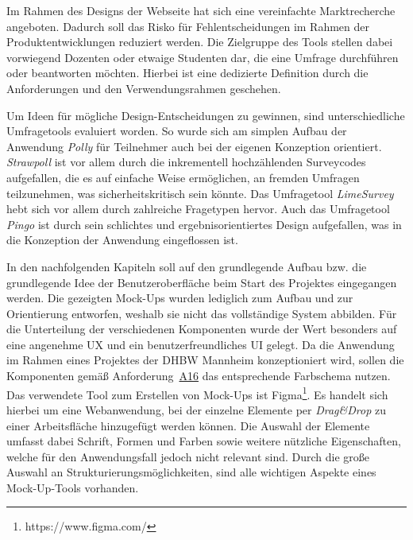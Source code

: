 Im Rahmen des Designs der Webseite hat sich eine vereinfachte Marktrecherche angeboten.
Dadurch soll das Risko für Fehlentscheidungen im Rahmen der Produktentwicklungen reduziert werden.\autocite{Pioch2019}
Die Zielgruppe des Tools stellen dabei vorwiegend Dozenten oder etwaige Studenten dar, die eine Umfrage durchführen oder beantworten möchten.
Hierbei ist eine dedizierte Definition durch die Anforderungen und den Verwendungsrahmen geschehen.

Um Ideen für mögliche Design-Entscheidungen zu gewinnen, sind unterschiedliche Umfragetools evaluiert worden.
So wurde sich am simplen Aufbau der Anwendung \emph{Polly} für Teilnehmer auch bei der eigenen Konzeption orientiert.
\emph{Strawpoll} ist vor allem durch die inkrementell hochzählenden Surveycodes aufgefallen, die es auf einfache Weise ermöglichen, an fremden Umfragen teilzunehmen, was sicherheitskritisch sein könnte.
Das Umfragetool \emph{LimeSurvey} hebt sich vor allem durch zahlreiche Fragetypen hervor.
Auch das Umfragetool \emph{Pingo} ist durch sein schlichtes und ergebnisorientiertes Design aufgefallen, was in die Konzeption der Anwendung eingeflossen ist.

In den nachfolgenden Kapiteln soll auf den grundlegende Aufbau bzw. die grundlegende Idee der Benutzeroberfläche beim Start des Projektes eingegangen werden.
Die gezeigten Mock-Ups wurden lediglich zum Aufbau und zur Orientierung entworfen, weshalb sie nicht das vollständige System abbilden.
Für die Unterteilung der verschiedenen Komponenten wurde der Wert besonders auf eine angenehme \acf{UX} und ein benutzerfreundliches \acf{UI} gelegt.
Da die Anwendung im Rahmen eines Projektes der \acs{DHBW} Mannheim konzeptioniert wird, sollen die Komponenten gemäß Anforderung~\hyperref[Anf:A16]{A16} das entsprechende Farbschema nutzen.
Das verwendete Tool zum Erstellen von Mock-Ups ist Figma\footnote{https://www.figma.com/}.
Es handelt sich hierbei um eine Webanwendung, bei der einzelne Elemente per \emph{Drag\&Drop} zu einer Arbeitsfläche hinzugefügt werden können.
Die Auswahl der Elemente umfasst dabei Schrift, Formen und Farben sowie weitere nützliche Eigenschaften, welche für den Anwendungsfall jedoch nicht relevant sind.
Durch die große Auswahl an Strukturierungsmöglichkeiten, sind alle wichtigen Aspekte eines Mock-Up-Tools vorhanden.
